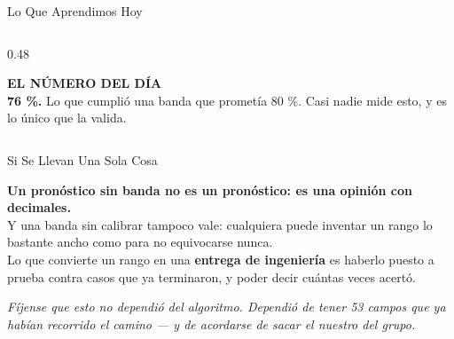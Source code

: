 \documentclass[aspectratio=169, 11pt]{beamer}
\begin{document}
\begin{frame}[shrink=10]{Lo Que Aprendimos Hoy}
\begin{columns}[T]
\begin{column}{0.48\textwidth}
{\begin{itemize}
      \end{itemize}}
      \vspace{6pt}
      \begin{tcolorbox}[colback=arcaGray, colframe=arcaRed, boxrule=0pt, leftrule=3pt,
        arc=3pt, left=6pt, right=6pt, top=4pt, bottom=4pt]
        {\scriptsize\color{arcaRed}\bfseries EL NÚMERO DEL DÍA}\\[3pt]
        {\scriptsize\color{textMuted}
         \textbf{76 \%.} Lo que cumplió una banda que prometía 80 \%.
         Casi nadie mide esto, y es lo único que la valida.}
      \end{tcolorbox}
    \end{column}
  \end{columns}
\end{frame}

\begin{frame}[shrink=8]{Si Se Llevan Una Sola Cosa}
  \vspace{6pt}
  \begin{tcolorbox}[colback=arcaGray, colframe=arcaRed, boxrule=0pt, leftrule=4pt,
    arc=3pt, left=10pt, right=10pt, top=9pt, bottom=9pt]
    {\large\color{arcaDark}\bfseries
     Un pronóstico sin banda no es un pronóstico: es una opinión con
     decimales.}\\[7pt]
    {\footnotesize\color{textMuted}
     Y una banda sin calibrar tampoco vale: cualquiera puede inventar un
     rango lo bastante ancho como para no equivocarse nunca.\\[6pt]
     Lo que convierte un rango en una \textbf{entrega de ingeniería} es
     haberlo puesto a prueba contra casos que ya terminaron, y poder decir
     cuántas veces acertó.}
  \end{tcolorbox}
  \vspace{8pt}
  {\footnotesize\color{arcaDark}\itshape
   Fíjense que esto no dependió del algoritmo. Dependió de tener 53 campos
   que ya habían recorrido el camino --- y de acordarse de sacar el nuestro
   del grupo.}
\end{frame}
\end{document}
